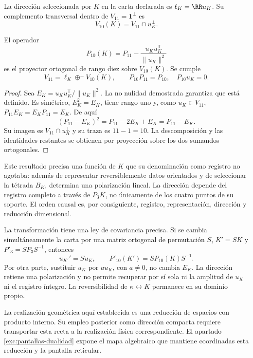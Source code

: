 \begin{definition}
La dirección seleccionada por \(K\) en la carta declarada es
\(\ell_K=\RR u_K\). Su complemento transversal dentro de
\(V_{11}=\mathbf1^\perp\) es
\[
 V_{10}(K)=V_{11}\cap u_K^\perp.
\]
\end{definition}

\begin{proposition}
\label{prop:k-reduccion-diez}
El operador
\begin{equation}
 P_{10}(K)=P_{11}
       -\frac{u_Ku_K^{\mathsf T}}{\lVert u_K\rVert^2}
 \label{eq:k-proyector-diez}
\end{equation}
es el proyector ortogonal de rango diez sobre \(V_{10}(K)\). Se cumple
\[
 V_{11}=\ell_K\mathbin{\oplus^{\perp}}V_{10}(K),
 \qquad P_{10}P_{11}=P_{10},\quad P_{10}u_K=0.
\]
\end{proposition}
\begin{proof}
Sea \(E_K=u_Ku_K^{\mathsf T}/\lVert u_K\rVert^2\). La
no nulidad demostrada garantiza que está definido. Es simétrico,
\(E_K^2=E_K\), tiene rango uno y, como \(u_K\in V_{11}\),
\(P_{11}E_K=E_KP_{11}=E_K\). De aquí
\[
 (P_{11}-E_K)^2=P_{11}-2E_K+E_K=P_{11}-E_K.
\]
Su imagen es \(V_{11}\cap u_K^\perp\) y su traza es
\(11-1=10\). La descomposición y las identidades restantes se
obtienen por proyección sobre los dos sumandos ortogonales.
\end{proof}

Este resultado precisa una función de \(K\) que su denominación como
registro no agotaba: además de representar reversiblemente datos
orientados y de seleccionar la tétrada \(B_K\), determina una
polarización lineal. La dirección depende del registro completo a
través de \(P_3K\), no únicamente de los cuatro puntos de su soporte.
El orden causal es, por consiguiente, registro, representación,
dirección y reducción dimensional.

La transformación tiene una ley de covariancia precisa. Si se cambia
simultáneamente la carta por una matriz ortogonal de permutación \(S\),
\(K'=SK\) y \(P'_3=SP_3S^{-1}\), entonces
\[
 u_{K'}'=Su_K,\qquad P'_{10}(K')=SP_{10}(K)S^{-1}.
\]
Por otra parte, sustituir \(u_K\) por \(a u_K\), con \(a\ne0\),
no cambia \(E_K\). La dirección retiene una polarización y no
permite recuperar por sí sola ni la amplitud de \(u_K\) ni el
registro íntegro. La reversibilidad de \(\kappa\leftrightarrow K\)
permanece en su dominio propio.

La realización geométrica aquí establecida es una reducción de espacios
con producto interno. Su empleo posterior como dirección compacta
requiere transportar esta recta a la realización física correspondiente.
El apartado \ref{exc:pantallas-dualidad} expone el mapa algebraico
que mantiene coordinadas esta reducción y la pantalla reticular.
